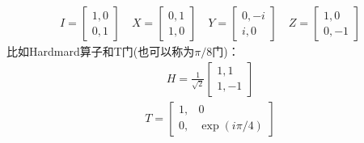 \begin{align}
    I = \left[\begin{matrix}
        1,0\\0,1
    \end{matrix}\right]
    \quad
    X = \left[\begin{matrix}
        0,1\\1,0
    \end{matrix}\right]
    \quad
    Y = \left[\begin{matrix}
        0,-i\\i,0
    \end{matrix}\right]
    \quad
    Z = \left[\begin{matrix}
        1,0\\0,-1
    \end{matrix}\right]
    \label{eq-pauli}
\end{align}
比如Hardmard算子和T门(也可以称为\(\pi/8\)门)：
\begin{align}
    H = \frac{1}{\sqrt{2}}\left[\begin{matrix}
        1,1\\1,-1
    \end{matrix}\right]
    \label{eq-hardmard}
\end{align}
\begin{align}
    T = \left[\begin{matrix}
        1,&0\\0,&\exp(i\pi/4)
    \end{matrix}\right]
    \label{eq-t}
\end{align}

